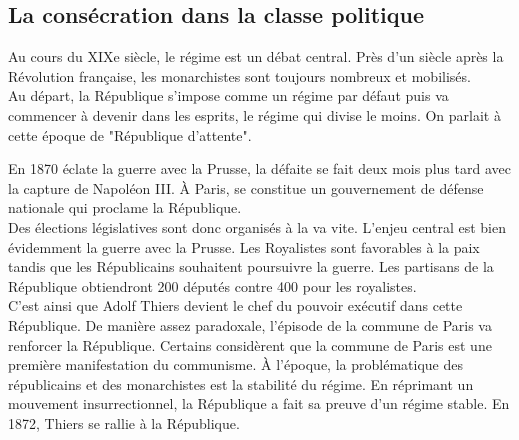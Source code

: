 \documentclass[10pt, a4paper, openany]{book}
\begin{document}
\subsection{La consécration dans la classe politique}

Au cours du XIXe siècle, le régime est un débat central. Près d'un siècle après la Révolution française, les monarchistes sont toujours nombreux et mobilisés. \\
Au départ, la République s'impose comme un régime par défaut puis va commencer à devenir dans les esprits, le régime qui divise le moins. On parlait à cette époque de "République d'attente".


En 1870 éclate la guerre avec la Prusse, la défaite se fait deux mois plus tard avec la capture de Napoléon III. À Paris, se constitue un gouvernement de défense nationale qui proclame la République. \\
Des élections législatives sont donc organisés à la va vite. L'enjeu central est bien évidemment la guerre avec la Prusse. Les Royalistes sont favorables à la paix tandis que les Républicains souhaitent poursuivre la guerre. Les partisans de la République obtiendront 200 députés contre 400 pour les royalistes. \\
C'est ainsi que Adolf Thiers devient le chef du pouvoir exécutif dans cette République. De manière assez paradoxale, l'épisode de la commune de Paris va renforcer la République. Certains considèrent que la commune de Paris est une première manifestation du communisme. À l'époque, la problématique des républicains et des monarchistes est la stabilité du régime. En réprimant un mouvement insurrectionnel, la République a fait sa preuve d'un régime stable. En 1872, Thiers se rallie à la République.
\end{document}
